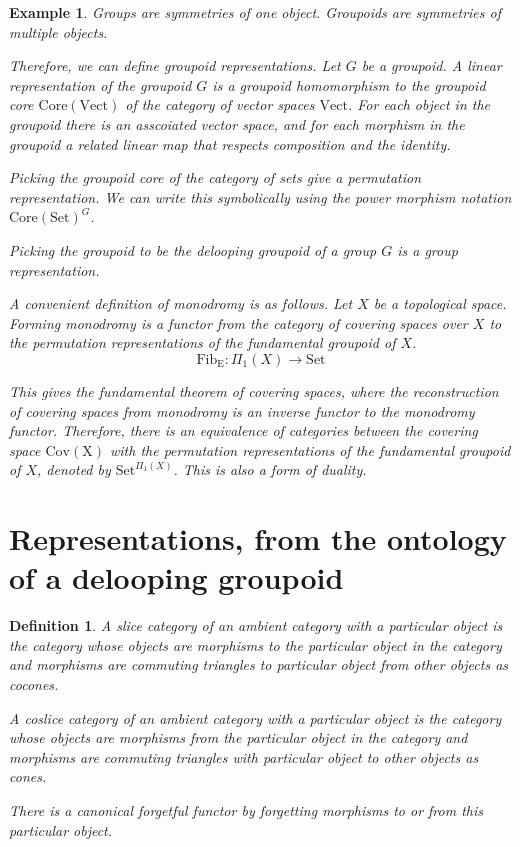 \documentclass{tufte-book}
\newtheorem{definition}[theorem]{Definition}
\newtheorem{example}[theorem]{Example}
\begin{document}
\begin{example}
	Groups are symmetries of one object. Groupoids are symmetries of multiple objects.

	Therefore, we can define groupoid representations. Let $G$ be a groupoid. A linear representation of the groupoid $G$ is a groupoid homomorphism to the groupoid core $\mathrm{Core(Vect)}$ of the category of vector spaces $\mathrm{Vect}$. For each object in the groupoid there is an asscoiated vector space, and for each morphism in the groupoid a related linear map that respects composition and the identity.

	Picking the groupoid core of the category of sets give a permutation representation. We can write this symbolically using the power morphism notation $\mathrm{Core(Set)}^{G}$.

	Picking the groupoid to be the delooping groupoid of a group $G$ is a group representation.

	A convenient definition of monodromy is as follows. Let $X$ be a topological space. Forming monodromy is a functor from the category of covering spaces over $X$ to the permutation representations of the fundamental groupoid of $X$.
	\begin{equation}
		\mathrm{Fib_{E}} : \Pi_1(X) \rightarrow \mathrm{Set}
	\end{equation}

	This gives the fundamental theorem of covering spaces, where the reconstruction of covering spaces from monodromy is an inverse functor to the monodromy functor. Therefore, there is an equivalence of categories between the covering space $\mathrm{Cov(X)}$ with the permutation representations of the fundamental groupoid of $X$, denoted by $\mathrm{Set}^{\Pi_1(X)}$. This is also a form of duality.
\end{example}

\section{Representations, from the ontology of a delooping groupoid}

\begin{definition}
	A slice category of an ambient category with a particular object is the category whose objects are morphisms to the particular object in the category and morphisms are commuting triangles to particular object from other objects as cocones.

	A coslice category of an ambient category with a particular object is the category whose objects are morphisms from the particular object in the category and morphisms are commuting triangles with particular object to other objects as cones.

	There is a canonical forgetful functor by forgetting morphisms to or from this particular object.
\end{definition}
\end{document}
